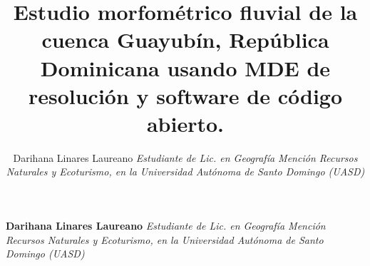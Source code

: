 \documentclass[11pt,]{article}
\title{Estudio morfométrico fluvial de la cuenca Guayubín, República Dominicana
usando MDE de resolución y software de código abierto.  }
\author{\Large Darihana Linares Laureano\vspace{0.05in} \newline\normalsize\emph{Estudiante de Lic. en Geografía Mención Recursos Naturales y Ecoturismo,
en la Universidad Autónoma de Santo Domingo (UASD)}  }
\date{}
\newcommand*{\authorfont}{\fontfamily{phv}\selectfont}
\begin{document}
	
%

{%
\setlength{\parindent}{0pt}
\thispagestyle{plain}
{\fontsize{18}{20}\selectfont\raggedright 
\maketitle  %

}

{
   \vskip 13.5pt\relax \normalsize\fontsize{11}{12} 
\textbf{\authorfont Darihana Linares Laureano} \hskip 15pt \emph{\small Estudiante de Lic. en Geografía Mención Recursos Naturales y Ecoturismo,
en la Universidad Autónoma de Santo Domingo (UASD)}   

}

}
\end{document}
